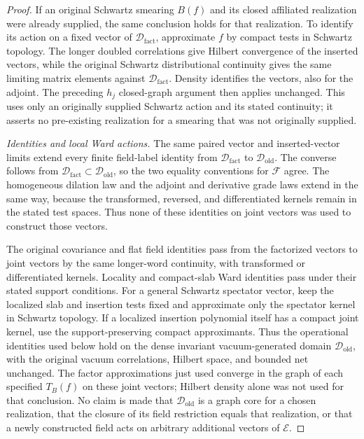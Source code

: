 \begin{proof}
If an original Schwartz smearing $B(f)$ and its closed affiliated
realization were already supplied, the same conclusion holds for that
realization. To identify its action on a fixed vector of
$\mathcal D_{\mathrm{fact}}$, approximate $f$ by compact tests in Schwartz
topology. The longer doubled correlations give Hilbert convergence of the
inserted vectors, while the original Schwartz distributional continuity
gives the same limiting matrix elements against
$\mathcal D_{\mathrm{fact}}$. Density identifies the vectors, also for the
adjoint. The preceding $h_j$ closed-graph argument then applies unchanged.
This uses only an originally supplied Schwartz action and its stated
continuity; it asserts no pre-existing realization for a smearing that was
not originally supplied.

\emph{Identities and local Ward actions.}
The same paired vector and inserted-vector limits extend every finite
field-label identity from $\mathcal D_{\mathrm{fact}}$ to
$\mathcal D_{\mathrm{old}}$. The converse follows from
$\mathcal D_{\mathrm{fact}}\subset\mathcal D_{\mathrm{old}}$, so the two
equality conventions for $\mathcal F$ agree. The homogeneous dilation law
and the adjoint and derivative grade laws extend in the same way, because
the transformed, reversed, and differentiated kernels remain in the stated
test spaces. Thus none of these identities on joint vectors was used to
construct those vectors.

The original covariance and flat field identities pass from the factorized
vectors to joint vectors by the same longer-word continuity, with transformed
or differentiated kernels. Locality and compact-slab Ward identities pass
under their stated support conditions. For a general Schwartz spectator
vector, keep the localized slab and insertion tests fixed and approximate
only the spectator kernel in Schwartz topology. If a localized insertion
polynomial itself has a compact joint kernel, use the support-preserving
compact approximants.
Thus the operational identities used below hold on the dense invariant
vacuum-generated domain $\mathcal D_{\mathrm{old}}$, with the original
vacuum correlations, Hilbert space, and bounded net unchanged. The
factor approximations just used converge in the graph of each specified
$T_B(f)$ on these joint vectors; Hilbert density alone was not used for
that conclusion. No claim is made that $\mathcal D_{\mathrm{old}}$ is a
graph core for a chosen realization, that the closure of its field
restriction equals that realization, or that a newly constructed field acts on arbitrary additional
vectors of $\mathcal E$.
\end{proof}

